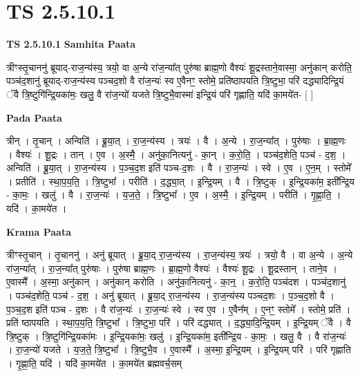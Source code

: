 \documentclass[17pt]{extarticle}
\begin{document}
\section*{ TS 2.5.10.1 }

\textbf{TS 2.5.10.1 } \newline
\textbf{Samhita Paata} \newline

त्रीꣳस्तृ॒चाननु॑ ब्रूयाद्-राज॒न्य॑स्य॒ त्रयो॒ वा अ॒न्ये रा॑ज॒न्या᳚त् पुरु॑षा ब्राह्म॒णो वैश्यः॑ शू॒द्रस्ताने॒वास्मा॒ अनु॑कान् करोति॒ पञ्च॑द॒शानु॑ ब्रूयाद्-राज॒न्य॑स्य पञ्चद॒शो वै रा॑ज॒न्यः॑ स्व ए॒वैनꣳ॒॒ स्तोमे॒ प्रति॑ष्ठापयति त्रि॒ष्टुभा॒ परि॑ दद्ध्यादिन्द्रि॒यं ॅवै त्रि॒ष्टुगि॑न्द्रि॒यका॑मः॒ खलु॒ वै रा॑ज॒न्यो॑ यजते त्रि॒ष्टुभै॒वास्मा॑ इन्द्रि॒यं परि॑ गृह्णाति॒ यदि॑ का॒मये॑त-  [  ] \newline

\textbf{Pada Paata} \newline

त्रीन् । तृ॒चान् । अन्विति॑ । ब्रू॒या॒त् । रा॒ज॒न्य॑स्य । त्रयः॑ । वै । अ॒न्ये । रा॒ज॒न्या᳚त् । पुरु॑षाः । ब्रा॒ह्म॒णः । वैश्यः॑ । शू॒द्रः । तान् । ए॒व । अ॒स्मै॒ । अनु॑का॒नित्यनु॑ - का॒न् । क॒रो॒ति॒ । पञ्च॑द॒शेति॒ पञ्च॑ - द॒श॒ । अन्विति॑ । ब्रू॒या॒त् । रा॒ज॒न्य॑स्य । प॒ञ्च॒द॒श इति॑ पञ्च-द॒शः । वै । रा॒ज॒न्यः॑ । स्वे । ए॒व । ए॒न॒म् । स्तोमे᳚ । प्रतीति॑ । स्था॒प॒य॒ति॒ । त्रि॒ष्टुभा᳚ । परीति॑ । द॒द्ध्या॒त् । इ॒न्द्रि॒यम् । वै । त्रि॒ष्टुक् । इ॒न्द्रि॒यका॑म॒ इती᳚न्द्रि॒य - का॒मः॒ । खलु॑ । वै । रा॒ज॒न्यः॑ । य॒ज॒ते॒ । त्रि॒ष्टुभा᳚ । ए॒व । अ॒स्मै॒ । इ॒न्द्रि॒यम् । परीति॑ । गृ॒ह्णा॒ति॒ । यदि॑ । का॒मये॑त ।  \newline


\textbf{Krama Paata} \newline

त्रीꣳस्तृ॒चान् । तृ॒चाननु॑ । अनु॑ ब्रूयात् । ब्रू॒या॒द् रा॒ज॒न्य॑स्य । रा॒ज॒न्य॑स्य॒ त्रयः॑ । त्रयो॒ वै । वा अ॒न्ये । अ॒न्ये रा॑ज॒न्या᳚त् । रा॒ज॒न्या᳚त् पुरु॑षाः । पुरु॑षा ब्राह्म॒णः । ब्रा॒ह्म॒णो वैश्यः॑ । वैश्यः॑ शू॒द्रः । शू॒द्रस्तान् । ताने॒व । ए॒वास्मै᳚ । अ॒स्मा॒ अनु॑कान् । अनु॑कान् करोति । अनु॑का॒नित्यनु॑ - का॒न्॒ । क॒रो॒ति॒ पञ्च॑दश । पञ्च॑द॒शानु॑ । पञ्च॑द॒शेति॒ पञ्च॑ - द॒श॒ । अनु॑ ब्रूयात् । ब्रू॒या॒द् रा॒ज॒न्य॑स्य । रा॒ज॒न्य॑स्य पञ्चद॒शः । प॒ञ्च॒द॒शो वै । प॒ञ्च॒द॒श इति॑ पञ्च - द॒शः । वै रा॑ज॒न्यः॑ । रा॒ज॒न्यः॑ स्वे । स्व ए॒व । ए॒वैन᳚म् । ए॒नꣳ॒॒ स्तोमे᳚ । स्तोमे॒ प्रति॑ । प्रति॑ ष्ठापयति । स्था॒प॒य॒ति॒ त्रि॒ष्टुभा᳚ । त्रि॒ष्टुभा॒ परि॑ । परि॑ दद्ध्यात् । द॒द्ध्या॒दि॒न्द्रि॒यम् । इ॒न्द्रि॒यम् ॅवै । वै त्रि॒ष्टुक् । त्रि॒ष्टुगि॑न्द्रि॒यका॑मः । इ॒न्द्रि॒यका॑मः॒ खलु॑ । इ॒न्द्रि॒यका॑म॒ इती᳚न्द्रि॒य - का॒मः॒ । खलु॒ वै । वै रा॑ज॒न्यः॑ । रा॒ज॒न्यो॑ यजते । य॒ज॒ते॒ त्रि॒ष्टुभा᳚ । त्रि॒ष्टुभै॒व । ए॒वास्मै᳚ । अ॒स्मा॒ इ॒न्द्रि॒यम् । इ॒न्द्रि॒यम् परि॑ । परि॑ गृह्णाति । गृ॒ह्णा॒ति॒ यदि॑ । यदि॑ का॒मये॑त । का॒मये॑त ब्रह्मवर्च॒सम् \newline
\end{document}
